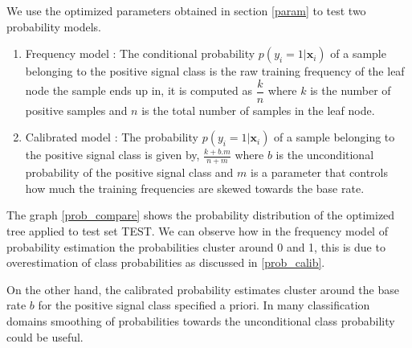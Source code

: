 \documentclass[final,3p,times,twocolumn]{elsarticle}
\begin{document}
We use the optimized parameters obtained in section \ref{param} to test two probability models. 

\begin{enumerate}
\item Frequency model : The conditional probability $p(y_{i}=1|\textbf{x}_{i})$ of a sample belonging to the positive signal class is the raw training frequency of the leaf node the sample ends up in, it is computed as $\dfrac{k}{n}$ where $k$ is the number of positive samples and $n$ is the total number of samples in the leaf node.  
\item Calibrated model : The probability $p(y_{i}=1|\textbf{x}_{i})$ of a sample belonging to the positive signal class is given by, $\frac{\displaystyle k + b.m}{\displaystyle n + m}$ where $b$ is the unconditional probability of the positive signal class and $m$ is a parameter that controls how much the training frequencies are skewed towards the base rate.
\end{enumerate}

The graph \ref{prob_compare} shows the probability distribution of the optimized tree applied to test set TEST. We can observe how in the frequency model of probability estimation the probabilities cluster around 0 and 1, this is due to overestimation of class probabilities as discussed in \ref{prob_calib}. 

On the other hand, the calibrated probability estimates cluster around the base rate $b$ for the positive signal class specified a priori. In many classification domains smoothing of probabilities towards the unconditional class probability could be useful. 
\end{document}
